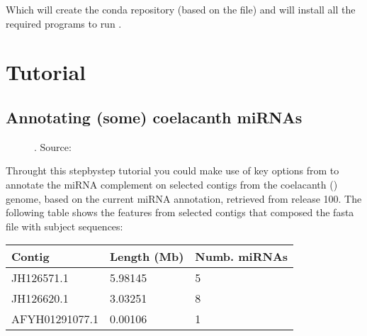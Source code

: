 \documentclass[letterpaper,10pt,english]{sphinxmanual}
\let\sphinxpxdimen\pdfpxdimen\else\newdimen\sphinxpxdimen
\begin{document}
\begin{sphinxVerbatim}[commandchars=\\\{\}]
\end{sphinxVerbatim}

Which will create the  conda repository (based on the
 file) and will install all the required programs to run
.


\section{Tutorial}
\label{\detokenize{tutorial:tutorial}}\label{\detokenize{tutorial::doc}}

\subsection{Annotating (some) coelacanth miRNAs}
\label{\detokenize{tutorial:annotating-some-coelacanth-mirnas}}
\begin{figure}[htbp]
\centering
\capstart

\noindent\sphinxincludegraphics[width=320\sphinxpxdimen,height=116\sphinxpxdimen]{{coel}.jpg}
\caption{. Source: }\label{\detokenize{tutorial:id1}}\end{figure}

Throught this step\sphinxhyphen{}by\sphinxhyphen{}step tutorial you could make use of key options from
 to annotate the  miRNA complement on selected contigs
from the coelacanth () genome, based on the current miRNA
annotation, retrieved from  release 100. The following table shows
the features from selected contigs that composed the fasta file with subject
sequences:


\begin{savenotes}\sphinxattablestart
\centering
\begin{tabulary}{\linewidth}[t]{|T|T|T|}
\hline
\sphinxstyletheadfamily 
Contig
&\sphinxstyletheadfamily 
Length (Mb)
&\sphinxstyletheadfamily 
Numb. miRNAs
\\
\hline
JH126571.1
&
5.98145
&
5
\\
\hline
JH126620.1
&
3.03251
&
8
\\
\hline
AFYH01291077.1
&
0.00106
&
1
\\
\hline
\end{tabulary}
\par
\sphinxattableend\end{savenotes}
\end{document}
